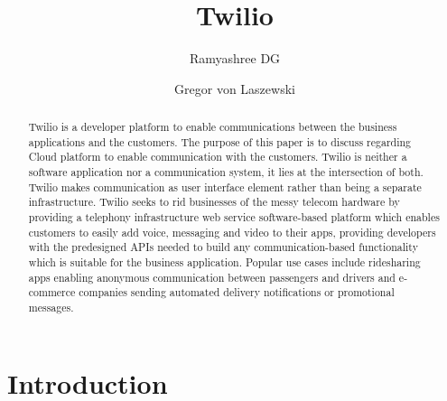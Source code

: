 
\title{Twilio}


\author{Ramyashree DG}


\author{Gregor von Laszewski}


\renewcommand{\shortauthors}{G. v. Laszewski}


\begin{abstract}

Twilio is a  developer platform to enable communications between the business 
applications and the customers. The purpose of this paper is to discuss 
regarding Cloud platform to enable communication with the customers. Twilio is 
neither a software application nor a communication system, it lies at the 
intersection of both. Twilio makes communication as user interface element 
rather than being a separate infrastructure. Twilio seeks to rid businesses of 
the messy telecom hardware by providing a telephony infrastructure web service
software-based platform which enables customers to easily add voice, messaging
and video to their apps,  providing developers with the predesigned APIs needed
to build any communication-based functionality which is suitable for the 
business application. Popular use cases include ridesharing apps enabling 
anonymous communication between passengers and drivers and e-commerce companies
sending automated delivery notifications or promotional messages.

\end{abstract}


\maketitle

\section{Introduction}

